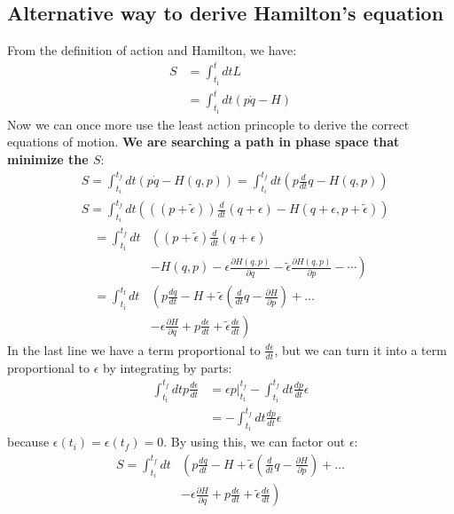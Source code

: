 \subsection{Alternative way to derive Hamilton's equation}
From the definition of action and Hamilton, we have:
$$
\begin{aligned}
S &=\int_{t_{\mathrm{i}}}^{t} d t L \\
&=\int_{t_{\mathrm{i}}}^{t} d t(p \dot{q}-H)
\end{aligned}
$$
Now we can once more use the least action princople to derive the correct equations of motion. \textbf{We are searching a path in phase space that minimize the $S$}:
$$
\begin{aligned}
&S=\int_{t_{i}}^{t_{f}} d t(p \dot{q}-H(q, p))=\int_{t_{i}}^{t_{f}} d t\left(p \frac{d}{d t} q-H(q, p)\right)\\
&S=\int_{t_{i}}^{t_{f}} d t\left(((p+\tilde{\epsilon})) \frac{d}{d t}(q+\epsilon)-H(q+\epsilon, p+\tilde{\epsilon})\right)
\end{aligned}
$$
$$
\begin{aligned}
=\int_{t_{\mathrm{i}}}^{t_{f}} d t &\left((p+\tilde{\epsilon}) \frac{d}{d t}(q+\epsilon)\right.\\
&\left.-H(q, p)-\epsilon \frac{\partial H(q, p)}{\partial q}-\tilde{\epsilon} \frac{\partial H(q, p)}{\partial p}-\cdots\right) \\
=\int_{t_{\mathrm{i}}}^{t_{\mathrm{f}}} d t &\left(p \frac{d q}{d t}-H+\tilde{\epsilon}\left(\frac{d}{d t} q-\frac{\partial H}{\partial p}\right)+\ldots\right.\\
&\left.-\epsilon \frac{\partial H}{\partial q}+p \frac{d \epsilon}{d t}+\tilde{\epsilon} \frac{d \epsilon}{d t}\right)
\end{aligned}
$$
In the last line we have a term proportional to $\frac{d\epsilon}{dt}$, but we can turn it into a term proportional to $\epsilon$ by integrating by parts:
$$
\begin{aligned}
\int_{t_{\mathrm{i}}}^{t_{f}} d t p \frac{d \epsilon}{d t} &=\left.\epsilon p\right|_{t_{\mathrm{i}}} ^{t_{f}}-\int_{t_{\mathrm{i}}}^{t_{f}} d t \frac{d p}{d t} \epsilon \\
&=-\int_{t_{\mathrm{i}}}^{t_{f}} d t \frac{d p}{d t} \epsilon
\end{aligned}
$$
because $\epsilon\left(t_{i}\right)=\epsilon\left(t_{f}\right)=0$. By using this, we can factor out $\epsilon$:
$$
\begin{aligned}
S=\int_{t_{i}}^{t_{f}} d t &\left(p \frac{d q}{d t}-H+\tilde{\epsilon}\left(\frac{d}{d t} q-\frac{\partial H}{\partial p}\right)+\ldots\right.\\
&\left.-\epsilon \frac{\partial H}{\partial q}+p \frac{d \epsilon}{d t}+\tilde{\epsilon} \frac{d \epsilon}{d t}\right)
\end{aligned}
$$
